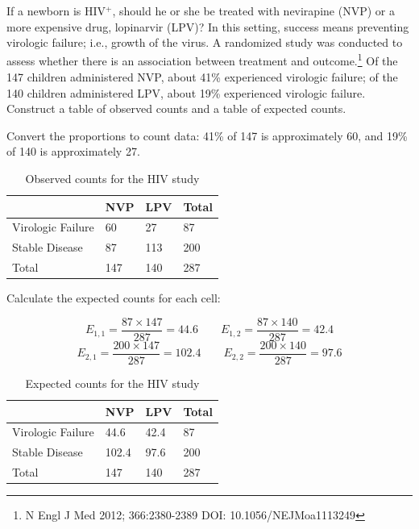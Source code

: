 \begin{example} {If a newborn is HIV$^+$, should he or she be treated with nevirapine (NVP) or a more expensive drug, lopinarvir (LPV)? In this setting, success means preventing virologic failure; i.e., growth of the virus. A randomized study was conducted to assess whether there is an association between treatment and outcome.\footnote{N Engl J Med 2012; 366:2380-2389
DOI: 10.1056/NEJMoa1113249} Of the 147 children administered NVP, about 41\% experienced virologic failure; of the 140 children administered LPV, about 19\% experienced virologic failure. Construct a table of observed counts and a table of expected counts.}
	
Convert the proportions to count data: 41\% of 147 is approximately 60, and 19\% of 140 is approximately 27. 

\begin{table}[h]
	\centering
	\begin{tabular}{l | l l | l}
	\hline
	& NVP & LPV & Total \\
	\hline
	Virologic Failure & 60 & 27 & 87 \\
	Stable Disease & 87 & 113 & 200 \\	
	\hline
	Total & 147 & 140 & 287 \\
	\hline
	\end{tabular}
	\caption{Observed counts for the HIV study}
\end{table}

Calculate the expected counts for each cell:

\[E_{1, 1} = \dfrac{87 \times 147}{287} = 44.6 \qquad E_{1, 2} = \dfrac{87 \times 140}{287} = 42.4 \]
\[E_{2, 1} = \dfrac{200 \times 147}{287} = 102.4 \qquad E_{2, 2} = \dfrac{200 \times 140}{287} = 97.6 \]

\begin{table}[h]
	\centering
	\begin{tabular}{l | l l | l}
		\hline
		& NVP & LPV & Total \\
		\hline
		Virologic Failure & 44.6 & 42.4 & 87 \\
		Stable Disease & 102.4 & 97.6 & 200 \\
		\hline	
		Total & 147 & 140 & 287 \\
		\hline
	\end{tabular}
	\caption{Expected counts for the HIV study}
\end{table}

\end{example}

